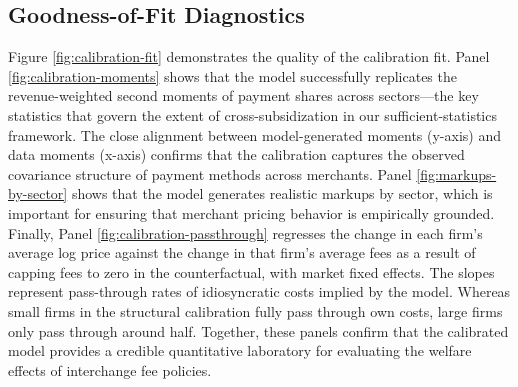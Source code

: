 \documentclass[main.tex]{subfiles}
\begin{document}
\subsection{Goodness-of-Fit Diagnostics}

Figure \ref{fig:calibration-fit} demonstrates the quality of the calibration fit.
Panel \ref{fig:calibration-moments} shows that the model successfully replicates the revenue-weighted second moments of payment shares across sectors---the key statistics that govern the extent of cross-subsidization in our sufficient-statistics framework.
The close alignment between model-generated moments (y-axis) and data moments (x-axis) confirms that the calibration captures the observed covariance structure of payment methods across merchants.
Panel \ref{fig:markups-by-sector} shows that the model generates realistic markups by sector, which is important for ensuring that merchant pricing behavior is empirically grounded.
Finally, Panel \ref{fig:calibration-passthrough} regresses the change in each firm's average log price against the change in that firm's average fees as a result of capping fees to zero in the counterfactual, with market fixed effects. The slopes represent pass-through rates of idiosyncratic costs implied by the model. Whereas small firms in the structural calibration fully pass through own costs, large firms only pass through around half.
Together, these panels confirm that the calibrated model provides a credible quantitative laboratory for evaluating the welfare effects of interchange fee policies.
\end{document}
